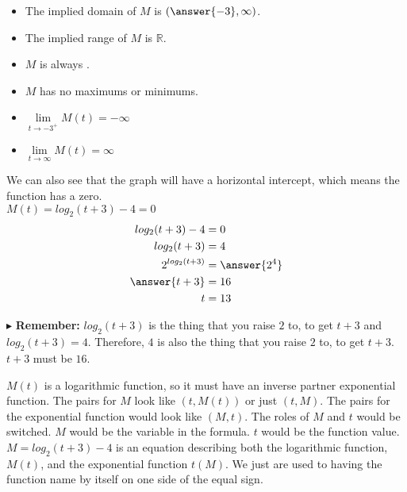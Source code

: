 \documentclass{ximera}
\begin{document}
\begin{example}
\begin{explanation}
\begin{itemize}
\item The implied domain of $M$ is $\left( \answer{-3} ,\infty \right)$.
\item The implied range of $M$ is $\mathbb{R}$.
\item $M$ is always  .
\item $M$ has no maximums or minimums.
\item $\lim\limits_{t \to -3^+} M(t) = -\infty$
\item $\lim\limits_{t \to \infty} M(t) = \infty$
\end{itemize}




We can also see that the graph will have a horizontal intercept, which means the function has a zero. \\


$M(t) = log_2(t+3) - 4 = 0$ \\


\begin{align*}
log_2(t+3) - 4 & = 0 \\
log_2(t+3) & = 4 \\
2^{log_2(t+3)} & = \answer{2^4} \\
\answer{t+3} & = 16 \\
t & = 13
\end{align*}


$\blacktriangleright$ \textbf{Remember:} $log_2(t+3)$ is the thing that you raise $2$ to, to get $t+3$ and $log_2(t+3) = 4$.  Therefore, $4$ is also the thing that you raise $2$ to, to get $t+3$. $t+3$ must be $16$.









\end{explanation}

\end{example}



$M(t)$ is a logarithmic function, so it must have an inverse partner exponential function.  The pairs for $M$ look like $(t, M(t))$ or just $(t,M)$. The pairs for the exponential function would look like $(M, t)$.  The roles of $M$ and $t$ would be switched. $M$ would be the variable in the formula. $t$ would be the function value.\\


$M = log_2(t+3) - 4$ is an equation describing both the logarithmic function, $M(t)$, and the exponential function $t(M)$.  We just are used to having the function name by itself on one side of the equal sign. \\
\end{document}
